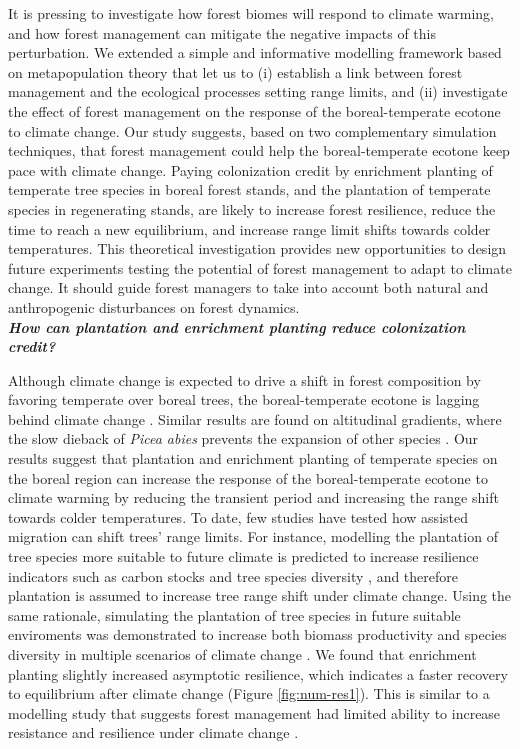 It is pressing to investigate how forest biomes will respond to climate
warming, and how forest management can mitigate the negative impacts of
this perturbation. We extended a simple and informative modelling
framework based on metapopulation theory that let us to (i) establish a
link between forest management and the ecological processes setting
range limits, and (ii) investigate the effect of forest management on
the response of the boreal-temperate ecotone to climate change. Our
study suggests, based on two complementary simulation techniques, that
forest management could help the boreal-temperate ecotone keep pace with
climate change. Paying colonization credit by enrichment planting of
temperate tree species in boreal forest stands, and the plantation of
temperate species in regenerating stands, are likely to increase forest
resilience, reduce the time to reach a new equilibrium, and increase
range limit shifts towards colder temperatures. This theoretical
investigation provides new opportunities to design future experiments
testing the potential of forest management to adapt to climate change.
It should guide forest managers to take into account both natural and
anthropogenic disturbances on forest dynamics.\\

\textbf{\emph{How can plantation and enrichment planting reduce
colonization credit?}}

Although climate change is expected to drive a shift in forest
composition by favoring temperate over boreal trees, the
boreal-temperate ecotone is lagging behind climate change
\citep{BoisvertMarsh2014, BoisvertMarsh2019, Talluto2017, Vissault2020}.
Similar results are found on altitudinal gradients, where the slow
dieback of \emph{Picea abies} prevents the expansion of other species
\citep{Scherrer2020}. Our results suggest that plantation and enrichment
planting of temperate species on the boreal region can increase the
response of the boreal-temperate ecotone to climate warming by reducing
the transient period and increasing the range shift towards colder
temperatures. To date, few studies have tested how assisted migration
can shift trees' range limits. For instance, modelling the plantation of
tree species more suitable to future climate is predicted to increase
resilience indicators such as carbon stocks and tree species diversity
\citep{Hof2017}, and therefore plantation is assumed to increase tree
range shift under climate change. Using the same rationale, simulating
the plantation of tree species in future suitable enviroments was
demonstrated to increase both biomass productivity and species diversity
in multiple scenarios of climate change \citep{Duveneck2015}. We found
that enrichment planting slightly increased asymptotic resilience, which
indicates a faster recovery to equilibrium after climate change (Figure
\ref{fig:num-res1}). This is similar to a modelling study that suggests
forest management had limited ability to increase resistance and
resilience under climate change \citep{Duveneck2016}.\\

